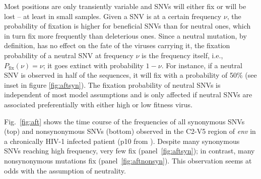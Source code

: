 \documentclass[rmp, twocolumn]{revtex4}
\newcommand{\pfix}{P_{\mathrm{fix}}}
\newcommand{\FIG}[1]{Fig.~\ref{fig:#1}}
\newcommand{\env}{\textit{env}}
\newcommand{\shankaregion}{C2-V5}
\begin{document}
Most positions are only transiently variable and SNVs will either fix or
will be lost -- at least in small samples. Given a SNV is at a certain
frequency $\nu$, the probability of fixation is higher for beneficial
SNVs than for neutral ones, which in turn fix more frequently than
deleterious ones. Since a neutral mutation, by definition, has no effect
on the fate of the viruses carrying it, the fixation probability of a
neutral SNV at frequency $\nu$ is the frequency itself, i.e.,
$\pfix(\nu) = \nu$; it goes extinct with probability $1-\nu$. For
instance, if a neutral SNV is observed in half of the sequences, it will
fix with a probability of 50\% (see inset in figure
\ref{fig:aftsyn}). The fixation probability of neutral SNVs is
independent of most model assumptions and is only affected if neutral
SNVs are associated preferentially with either high or low fitness
virus.

\FIG{aft} shows the time course of the frequencies of all synonymous
SNVs (top) and nonsynonymous SNVs (bottom) observed in the
\shankaregion{} region of \env{} in a chronically HIV-1 infected patient (p10 from
\citet{shankarappa_consistent_1999}). Despite many synonymous SNVs
reaching high frequency, very few fix (panel~\ref{fig:aftsyn}); in
contrast, many nonsynonymous mutations fix
(panel~\ref{fig:aftnonsyn}). This observation seems at odds with
the assumption of neutrality.

\end{document}
